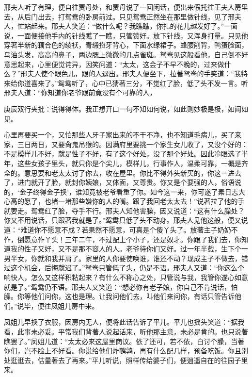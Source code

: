 \begin{parag}
    邢夫人听了有理，便自往贾母处，和贾母说了一回闲话，便出来假托往王夫人房里去，从后门出去，打鸳鸯的卧房前过。只见鸳鸯正然坐在那里做针线，见了邢夫人，忙站起来。邢夫人笑道：“做什么呢？我瞧瞧，你扎的花儿越发好了。”一面说，一面便接他手内的针线瞧了一瞧，只管赞好。放下针线，又浑身打量。只见他穿著半新的藕合色的绫袄，青缎掐牙背心，下面水绿裙子。蜂腰削背，鸭蛋脸面，乌油头发，高高的鼻子，两边腮上微微的几点雀斑。鸳鸯见这般看他，自己倒不好意思起来，心里便觉诧异，因笑问道：“太太，这会子不早不晚的，过来做什么？”邢夫人使个眼色儿，跟的人退出。邢夫人便坐下，拉著鸳鸯的手笑道：“我特来给你道喜来了。”鸳鸯听了，心中已猜著三分，不觉红了脸，低了头不发一言。听邢夫人道：“你知道你老爷跟前竟没有个可靠的人，\begin{note}庚辰双行夹批：说得得体。我正想开口一句不知如何说，如此则妙极是极，如闻如见。\end{note}心里再要买一个，又怕那些人牙子家出来的不干不净，也不知道毛病儿，买了来家，三日两日，又要肏鬼吊猴的。因满府里要挑一个家生女儿收了，又没个好的：不是模样儿不好，就是性子不好，有了这个好处，没了那个好处。因此冷眼选了半年，这些女孩子里头，就只你是个尖儿，模样儿，行事作人，温柔可靠，一概是齐全的。意思要和老太太讨了你去，收在屋里。你比不得外头新买的，你这一进去了，进门就开了脸，就封你姨娘，又体面，又尊贵。你又是个要强的人，俗语说的，‘金子终得金子换’，谁知竟被老爷看重了你。如今这一来，你可遂了素日志大心高的愿了，也堵一堵那些嫌你的人的嘴。跟了我回老太太去！”说著拉了他的手就要走。鸳鸯红了脸，夺手不行。邢夫人知他害臊，因又说道：“这有什么臊处？你又不用说话，只跟著我就是了。”鸳鸯只低了头不动身。邢夫人见他这般，便又说道：“难道你不愿意不成？若果然不愿意，可真是个傻丫头了。放著主子奶奶不作，倒愿意作丫头！三年二年，不过配上个小子，还是奴才。你跟了我们去，你知道我的性子又好，又不是那不容人的人。老爷待你们又好。过一年半载，生下个一男半女，你就和我并肩了。家里的人你要使唤谁，谁还不动？现成主子不做去，错过这个机会，后悔就迟了。”鸳鸯只管低了头，仍是不语。邢夫人又道：“你这么个响快人，怎么又这样积粘起来？有什么不称心之处，只管说与我，我管你遂心如意就是了。”鸳鸯仍不语。邢夫人又笑道：“想必你有老子娘，你自己不肯说话，怕臊。你等他们问你，这也是理。让我问他们去，叫他们来问你，有话只管告诉他们。”说毕，便往凤姐儿房中来。
\end{parag}


\begin{parag}
    凤姐儿早换了衣服，因房内无人，便将此话告诉了平儿。平儿也摇头笑道：“据我看，此事未必妥。平常我们背著人说起话来，听他那主意，未必是肯的。也只说著瞧罢了。”凤姐儿道：“太太必来这屋里商议。依了还可，若不依，白讨个臊，当著你们，岂不脸上不好看。你说给他们炸鹌鹑，再有什么配几样，预备吃饭。你且别处逛逛去，估量著去了再来。”平儿听说，照样传给婆子们，便逍遥自在的往园子里来。
\end{parag}


